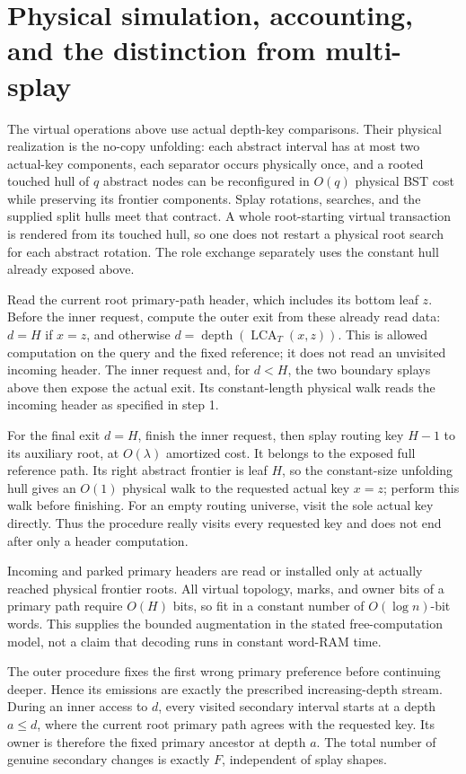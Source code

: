 \documentclass[11pt]{article}
\begin{document}
\section*{Physical simulation, accounting, and the distinction from multi-splay}

The virtual operations above use actual depth-key comparisons. Their
physical realization is the no-copy unfolding: each abstract interval
has at most two actual-key components, each separator occurs physically
once, and a rooted touched hull of $q$ abstract nodes can be reconfigured
in $O(q)$ physical BST cost while preserving its frontier components.
Splay rotations, searches, and the supplied split hulls meet that
contract. A whole root-starting virtual transaction is rendered from
its touched hull, so one does not restart a physical root search for
each abstract rotation. The role exchange separately uses the constant
hull already exposed above.

Read the current root primary-path header, which includes its bottom
leaf $z$. Before the inner request, compute the outer exit from these
already read data: $d=H$ if $x=z$, and otherwise
$d=\operatorname{depth}(\operatorname{LCA}_T(x,z))$. This is allowed
computation on the query and the fixed reference; it does not read an
unvisited incoming header. The inner request and, for $d<H$, the two
boundary splays above then expose the actual exit. Its constant-length
physical walk reads the incoming header as specified in step 1.

For the final exit $d=H$, finish the inner request, then splay routing
key $H-1$ to its auxiliary root, at $O(\lambda)$ amortized cost.
It belongs to the exposed full reference path. Its right abstract
frontier is leaf $H$, so the constant-size unfolding hull gives an
$O(1)$ physical walk to the requested actual key $x=z$; perform this
walk before finishing. For an empty routing universe, visit the sole
actual key directly. Thus the procedure really visits every requested
key and does not end after only a header computation.

Incoming and parked primary headers are read or
installed only at actually reached physical frontier roots. All
virtual topology, marks, and owner bits of a primary path require
$O(H)$ bits, so fit in a constant number of $O(\log n)$-bit words.
This supplies the bounded augmentation in the stated free-computation
model, not a claim that decoding runs in constant word-RAM time.

The outer procedure fixes the first wrong primary preference before
continuing deeper. Hence its emissions are exactly the prescribed
increasing-depth stream. During an inner access to $d$, every visited
secondary interval starts at a depth $a\le d$, where the current root
primary path agrees with the requested key. Its owner is therefore
the fixed primary ancestor at depth $a$. The total number of genuine
secondary changes is exactly $F$, independent of splay shapes.
\end{document}

